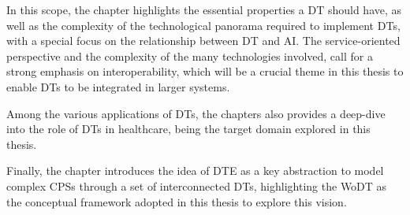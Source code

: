 In this scope, the chapter highlights the essential properties a \ac{DT} should have, as well as the complexity of the technological panorama required to implement \acp{DT}, with a special focus on the relationship between \ac{DT} and \ac{AI}.
%
The service-oriented perspective and the complexity of the many technologies involved, call for a strong emphasis on interoperability, which will be a crucial theme in this thesis to enable \acp{DT} to be integrated in larger systems.

Among the various applications of \acp{DT}, the chapters also provides a deep-dive into the role of \acp{DT} in healthcare, being the target domain explored in this thesis.

Finally, the chapter introduces the idea of \ac{DTE} as a key abstraction to model complex \acp{CPS} through a set of interconnected \acp{DT}, highlighting the \ac{WoDT} as the conceptual framework adopted in this thesis to explore this vision.